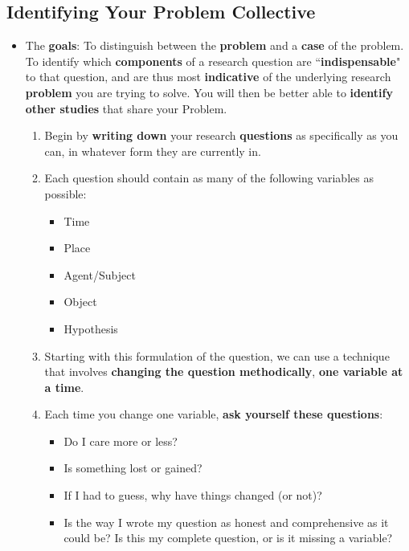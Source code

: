 \documentclass[11pt]{article}
\begin{document}
\subsection{Identifying Your Problem Collective}
\begin{itemize}
\item  \begin{exercise}

The \textbf{goals}: To distinguish between the \textbf{problem} and a \textbf{case} of the problem. To identify which \textbf{components} of a research question are ``\textbf{indispensable}" to that question, and are thus most \textbf{indicative} of the underlying research \textbf{problem} you are trying to solve. You will then be better able to \textbf{identify other studies} that share your Problem.

\begin{enumerate}
\item Begin by \textbf{writing down} your research \textbf{questions} as specifically as you can, in whatever form they are currently in.

\item Each question should contain as many of the following variables as possible:
\begin{itemize}
\item Time
\item Place
\item Agent/Subject
\item Object
\item Hypothesis
\end{itemize}

\item Starting with this formulation of the question, we can use a technique that involves \textbf{changing the question methodically}, \textbf{one variable at a time}. 

\item Each time you change one variable, \textbf{ask yourself these questions}:
\begin{itemize}
\item Do I care more or less?
\item Is something lost or gained?
\item If I had to guess, why have things changed (or not)?
\item Is the way I wrote my question as honest and comprehensive as it could be? Is this my complete question, or is it missing a variable?
\end{itemize}


\end{enumerate}
\end{exercise}
\end{itemize}
\end{document}
